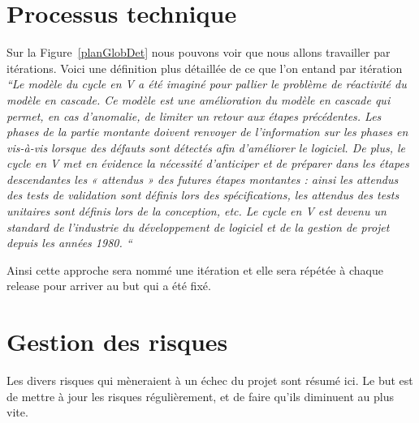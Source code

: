 \section{Processus technique}
Sur la Figure~\ref{planGlobDet} nous pouvons voir que nous allons travailler par itérations. Voici une définition plus détaillée de ce que l'on entand par itération 
\textit{``Le modèle du cycle en V a été imaginé pour pallier le problème de réactivité du modèle en cascade. Ce modèle est une amélioration du modèle en cascade qui permet, en cas d'anomalie, de limiter un retour aux étapes précédentes. Les phases de la partie montante doivent renvoyer de l'information sur les phases en vis-à-vis lorsque des défauts sont détectés afin d'améliorer le logiciel.
De plus, le cycle en V met en évidence la nécessité d'anticiper et de préparer dans les étapes descendantes les « attendus » des futures étapes montantes : ainsi les attendus des tests de validation sont définis lors des spécifications, les attendus des tests unitaires sont définis lors de la conception, etc.
Le cycle en V est devenu un standard de l'industrie du développement de logiciel et de la gestion de projet depuis les années 1980. ``}\cite{wikiV}

Ainsi cette approche sera nommé une itération et elle sera répétée à chaque release pour arriver au but qui a été fixé.
\section{Gestion des risques}
Les divers risques qui mèneraient à un échec du projet sont résumé ici. Le but est de mettre à jour les risques régulièrement, et de faire qu'ils diminuent au plus vite. 
